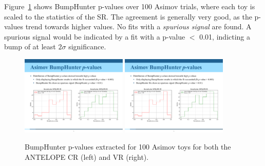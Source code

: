 Figure~\ref{fig:bh_asimov_pvals} shows BumpHunter p-values over 100 Asimov trials, where each toy is scaled to the statistics of the SR.
The agreement is generally very good, as the p-values trend towards higher values.
No fits with a \textit{spurious signal} are found.
A spurious signal would be indicated by a fit with a p-value $<$ 0.01, indicting a bump of at least $2\sigma$ significance.
\begin{figure}[!htbp]
\centering
   \includegraphics[width=0.45\textwidth]{figures/stats/bh_asimov_pvals_cr}
   \includegraphics[width=0.45\textwidth]{figures/stats/bh_asimov_pvals_vr}
    \caption{BumpHunter p-values extracted for 100 Asimov toys for both the ANTELOPE CR (left) and VR (right).
    \label{fig:bh_asimov_pvals}}
\end{figure}





